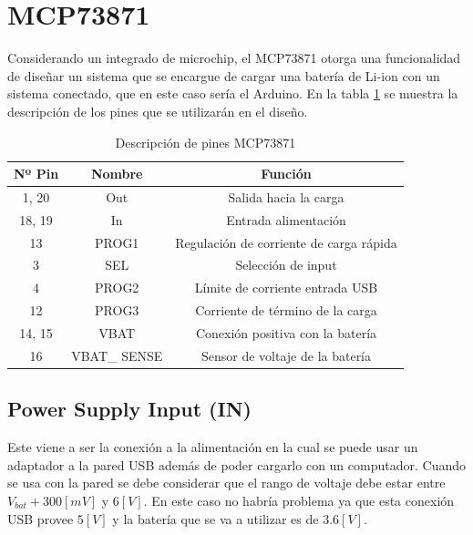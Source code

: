 \section{MCP73871}
Considerando un integrado de microchip, el MCP73871\cite{bateria} otorga una funcionalidad de diseñar un sistema que se encargue de cargar una batería de Li-ion con un sistema conectado, que en este caso sería el Arduino. En la tabla \ref{pinesmcp} se muestra la descripción de los pines que se utilizarán en el diseño.\\

\begin{table}[H]
\centering
\begin{tabular}{| c | c | c |}
\hline
\multicolumn{1}{|c|}{\textbf{Nº Pin}}&
\multicolumn{1}{c|}{\textbf{Nombre}}&
\multicolumn{1}{|c|}{\textbf{Función}}\\ \hline
1, 20 & Out & Salida hacia la carga\\ \hline
18, 19 & In & Entrada alimentación\\ \hline
13 & PROG1 & Regulación de corriente de carga rápida\\ \hline
3 & SEL & Selección de input\\ \hline
4 & PROG2 & Límite de corriente entrada USB\\ \hline
12 & PROG3 & Corriente de término de la carga\\ \hline
14, 15 & VBAT & Conexión positiva con la batería\\ \hline
16 & VBAT\_ SENSE & Sensor de voltaje de la batería\\ \hline
\end{tabular}
\caption{Descripción de pines MCP73871}
\label{pinesmcp}
\end{table}

\subsection{Power Supply Input (IN)}
Este viene a ser la conexión a la alimentación en la cual se puede usar un adaptador a la pared USB además de poder cargarlo con un computador. Cuando se usa con la pared se debe considerar que el rango de voltaje debe estar entre $V_{bat} +300[mV]$ y $6[V]$. En este caso no habría problema ya que esta conexión USB provee $5[V]$ y la batería que se va a utilizar es de $3.6 [V]$.

